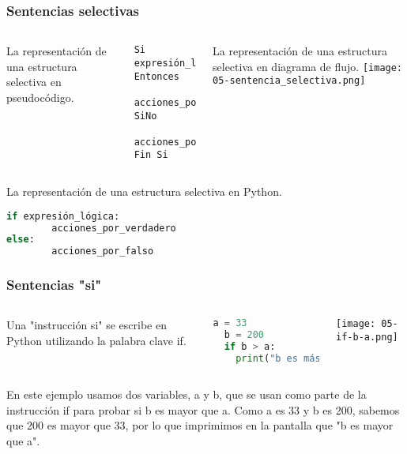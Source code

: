 \begin{frame}[fragile]
  \frametitle{Sentencias selectivas}

  \begin{columns}
    La representación de una estructura selectiva en pseudocódigo.
    \vspace{\baselineskip}
    \begin{lstlisting}[style=pseudocodigo]
Si expresión_lógica Entonces
		acciones_por_verdadero
SiNo
		acciones_por_falso
Fin Si\end{lstlisting}

    \pausa
    La representación de una estructura selectiva en diagrama de flujo.
    \texttt{[image: 05-sentencia\_selectiva.png]}
  \end{columns}

  \pausa
  \vspace{\baselineskip}
  La representación de una estructura selectiva en Python.
  \begin{lstlisting}[language=Python]
if expresión_lógica:
		acciones_por_verdadero
else:
		acciones_por_falso
  \end{lstlisting}
\end{frame}

\begin{frame}[fragile]
  \frametitle{Sentencias "si"}

  \begin{columns}
      Una "instrucción si" se escribe en Python utilizando la palabra clave
      \textcolor{codeKeyword}{if}.

      \vspace{\baselineskip}
      \begin{lstlisting}[language=Python]
  a = 33
  b = 200
  if b > a:
    print("b es más grande que a")\end{lstlisting}

    \texttt{[image: 05-if-b-a.png]}
  \end{columns}
  En este ejemplo usamos dos variables, a y b, que se usan como parte de
  la instrucción \textcolor{codeKeyword}{if} para probar si b es mayor
  que a. Como a es 33 y b es 200, sabemos que 200 es mayor que 33,
  por lo que imprimimos en la pantalla que "b es mayor que a".
\end{frame}

